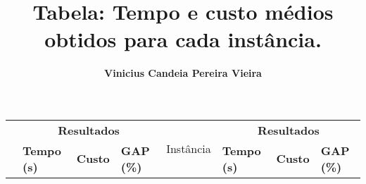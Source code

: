 \documentclass{article}
\title{\Large \textbf{Tabela: Tempo e custo médios obtidos para cada instância.}} %
\author{\textbf{Vinicius Candeia Pereira Vieira}} %
\begin{document}
\maketitle

\begin{table}[H]
\centering

\begin{tabular}{>{\bfseries}llll>{\bfseries}llll}

\toprule
\multirow{2}{*}{Instância} & \multicolumn{3}{c}{\textbf{Resultados}} & \multirow{2}{*}{Instância} & \multicolumn{3}{c}{\textbf{Resultados}} \\
\cmidrule(lr){2-4} \cmidrule(lr){6-8} 
& \textbf{Tempo (s)} & \textbf{Custo} & \textbf{GAP (\%)} & & \textbf{Tempo (s)} & \textbf{Custo} & \textbf{GAP (\%)} \\


\end{tabular}
\end{table}
\end{document}
